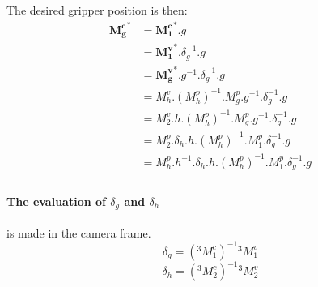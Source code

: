 \documentclass{article}
\newcommand{\M}[3]{{^#1}M^{#2}_{#3}}
\newcommand{\Minv}[3]{{\left( \M{#1}{#2}{#3} \right) }^{-1}}
\newcommand{\oM}[2]{M^{#1}_{#2}}
\newcommand{\oMinv}[2]{{\left( \oM{#1}{#2} \right) }^{-1}}
\begin{document}
The desired gripper position is then:
\begin{align*}
{\bm{\oM{c}{g}}}^* &= {\bm{\oM{c}{1}}}^*                                                    . g \\
                   &= {\bm{\oM{v}{1}}}^*                                      .\delta_g^{-1}. g \\
                   &= {\bm{\oM{v}{g}}}^*                               .g^{-1}.\delta_g^{-1}. g \\
                   &= \oM{v}{h}.\oMinv{p}{h}.{\oM{p}{g}}               .g^{-1}.\delta_g^{-1}. g \\
                   &= \oM{v}{2}.       h.\oMinv{p}{h}.\oM{p}{g}        .g^{-1}.\delta_g^{-1}. g \\
                   &= \oM{p}{2}.\delta_h.h.\oMinv{p}{h}.\oM{p}{1}               .\delta_g^{-1}. g \\
                   &= \oM{p}{h}.h^{-1}.\delta_h.h.\oMinv{p}{h}.\oM{p}{1}               .\delta_g^{-1}. g \\
\end{align*}

\paragraph{The evaluation of $\delta_g$ and $\delta_h$} is made in the camera frame.
$$ \delta_g = \Minv{3}{c}{1} \M{3}{v}{1} $$
$$ \delta_h = \Minv{3}{c}{2} \M{3}{v}{2} $$
\end{document}
